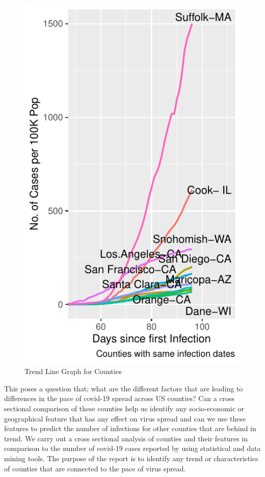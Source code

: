 \documentclass[
]{article}
\begin{document}
\begin{figure}
\centering
\includegraphics{covid_tree_analysis_files/figure-latex/unnamed-chunk-2-1.pdf}
\caption{Trend Line Graph for Counties}
\end{figure}

This poses a question that; what are the different factors that are
leading to differences in the pace of covid-19 spread across US
counties? Can a cross sectional comparison of these counties help us
identify any socio-economic or geographical feature that has any effect
on virus spread and can we use these features to predict the number of
infections for other counties that are behind in trend. We carry out a
cross sectional analysis of counties and their features in comparison to
the number of covid-19 cases reported by using statistical and data
mining tools. The purpose of the report is to identify any trend or
characteristics of counties that are connected to the pace of virus
spread.
\end{document}
